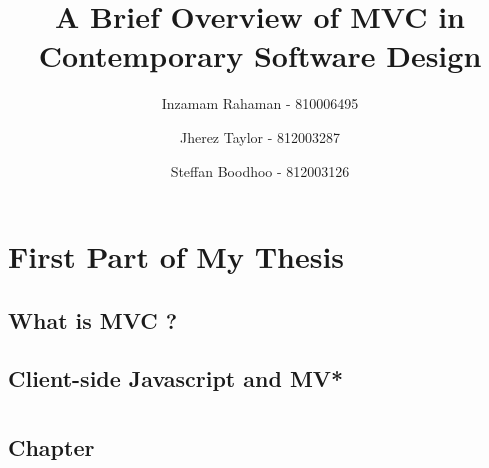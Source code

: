 \documentclass[
oneside,
openany,
12pt, a4paper,
footinclude=true,
headinclude=true,
cleardoublepage=empty
]{scrbook}
\title{A Brief Overview of MVC in Contemporary Software Design}
\author{Inzamam Rahaman - 810006495 \and Jherez Taylor - 812003287 \and Steffan Boodhoo - 812003126 }
\begin{document}
  \maketitle

  
  


  \part{First Part of My Thesis}

  \chapter{What is MVC ?}
  

  
  \chapter{Client-side Javascript and MV*}
  
  


  \part{}
  \chapter{ Chapter}
  \lipsum[1]
\end{document}
